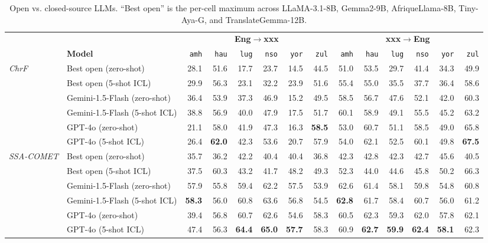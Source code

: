\begin{table}[t!]
\centering
\footnotesize
\setlength{\tabcolsep}{4pt}
\renewcommand{\arraystretch}{1.05}
\caption{Open vs. closed-source LLMs. ``Best open'' is the per-cell maximum across LLaMA-3.1-8B, Gemma2-9B, AfriqueLlama-8B, Tiny-Aya-G, and TranslateGemma-12B.}
\label{tab:open_vs_closed}
\begin{tabular}{llrrrrrrrrrrrr}
\toprule
 & & \multicolumn{6}{c}{\textbf{Eng$\to$xxx}} & \multicolumn{6}{c}{\textbf{xxx$\to$Eng}} \\
\cmidrule(lr){3-8}\cmidrule(lr){9-14}
 & \textbf{Model} & \texttt{amh} & \texttt{hau} & \texttt{lug} & \texttt{nso} & \texttt{yor} & \texttt{zul} & \texttt{amh} & \texttt{hau} & \texttt{lug} & \texttt{nso} & \texttt{yor} & \texttt{zul} \\
\midrule
\multirow{6}{*}{\textit{ChrF}} & Best open (zero-shot) & 28.1 & 51.6 & 17.7 & 23.7 & 14.5 & 44.5 & 51.0 & 53.5 & 29.7 & 41.4 & 34.3 & 49.9 \\
 & Best open (5-shot ICL) & 29.9 & 56.3 & 23.1 & 32.2 & 23.9 & 51.6 & 55.4 & 55.0 & 35.5 & 37.7 & 36.4 & 58.6 \\
 & Gemini-1.5-Flash (zero-shot) & 36.4 & 53.9 & 37.3 & 46.9 & 15.2 & 49.5 & 58.5 & 56.7 & 47.6 & 52.1 & 42.0 & 60.3 \\
 & Gemini-1.5-Flash (5-shot ICL) & 38.8 & 56.9 & 40.0 & 47.9 & 17.5 & 51.7 & 60.1 & 58.9 & 49.1 & 55.5 & 45.2 & 63.2 \\
 & GPT-4o (zero-shot) & 21.1 & 58.0 & 41.9 & 47.3 & 16.3 & \textbf{58.5} & 53.0 & 60.7 & 51.1 & 58.5 & 49.0 & 65.8 \\
 & GPT-4o (5-shot ICL) & 26.4 & \textbf{62.0} & 42.3 & 53.6 & 20.7 & 57.9 & 54.0 & 62.1 & 52.5 & 60.1 & 49.8 & \textbf{67.5} \\
\midrule
\multirow{6}{*}{\textit{SSA-COMET}} & Best open (zero-shot) & 35.7 & 36.2 & 42.2 & 40.4 & 40.4 & 36.8 & 42.3 & 42.8 & 42.3 & 42.7 & 45.6 & 40.5 \\
 & Best open (5-shot ICL) & 37.5 & 60.3 & 43.2 & 41.7 & 48.2 & 49.3 & 52.3 & 44.0 & 44.6 & 45.8 & 50.2 & 66.3 \\
 & Gemini-1.5-Flash (zero-shot) & 57.9 & 55.8 & 59.4 & 62.2 & 57.5 & 53.9 & 62.6 & 61.4 & 58.1 & 59.8 & 54.8 & 60.8 \\
 & Gemini-1.5-Flash (5-shot ICL) & \textbf{58.3} & 56.0 & 60.8 & 63.6 & 56.8 & 54.5 & \textbf{62.8} & 61.7 & 58.4 & 60.7 & 56.0 & 61.2 \\
 & GPT-4o (zero-shot) & 39.4 & 56.8 & 60.7 & 62.6 & 54.6 & 58.3 & 60.5 & 62.3 & 59.3 & 62.0 & 57.8 & 62.1 \\
 & GPT-4o (5-shot ICL) & 47.4 & 56.3 & \textbf{64.4} & \textbf{65.0} & \textbf{57.7} & 58.3 & 60.9 & \textbf{62.7} & \textbf{59.9} & \textbf{62.4} & \textbf{58.1} & 62.3 \\
\bottomrule
\end{tabular}
\end{table}